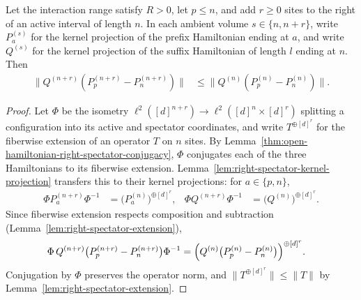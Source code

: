 \begin{lemma}
    \label{thm:grouped_spectator_norm}
    \leanok
    Let the interaction range satisfy $R>0$, let $p\leq n$, and add
    $r\geq0$ sites to the right of an active interval of length $n$.
    In each ambient volume $s\in\{n,n+r\}$, write $P^{(s)}_a$ for the
    kernel projection of the prefix Hamiltonian ending at $a$, and write
    $Q^{(s)}$ for the kernel projection of the suffix Hamiltonian of length
    $l$ ending at $n$. Then
    \begin{align}
        \bigl\lVert Q^{(n+r)}(P^{(n+r)}_p-P^{(n+r)}_n)\bigr\rVert
         & \leq
        \bigl\lVert Q^{(n)}(P^{(n)}_p-P^{(n)}_n)\bigr\rVert.
    \end{align}
\end{lemma}
\begin{proof}
    \leanok
    Let $\Phi$ be the isometry $\ell^2([d]^{n+r})\to\ell^2([d]^n\times[d]^r)$
    splitting a configuration into its active and spectator coordinates, and
    write $T^{\oplus[d]^r}$ for the fiberwise extension of an operator $T$
    on $n$ sites. By
    Lemma~\ref{thm:open-hamiltonian-right-spectator-conjugacy}, $\Phi$
    conjugates each of the three Hamiltonians to its fiberwise extension.
    Lemma~\ref{lem:right-spectator-kernel-projection} transfers this to
    their kernel projections: for $a\in\{p,n\}$,
    \begin{align}
        \Phi P^{(n+r)}_a\Phi^{-1} & =\bigl(P^{(n)}_a\bigr)^{\oplus[d]^r}, &
        \Phi Q^{(n+r)}\Phi^{-1}   & =\bigl(Q^{(n)}\bigr)^{\oplus[d]^r}.
    \end{align}
    Since fiberwise extension respects composition and subtraction
    (Lemma~\ref{lem:right-spectator-extension}),
    \begin{align}
        \Phi\,Q^{(n+r)}\bigl(P^{(n+r)}_p-P^{(n+r)}_n\bigr)\Phi^{-1}
         & =\Bigl(Q^{(n)}\bigl(P^{(n)}_p-P^{(n)}_n\bigr)\Bigr)^{\oplus[d]^r}.
    \end{align}
    Conjugation by $\Phi$ preserves the operator norm, and
    $\lVert T^{\oplus[d]^r}\rVert\leq\lVert T\rVert$ by
    Lemma~\ref{lem:right-spectator-extension}.
\end{proof}

